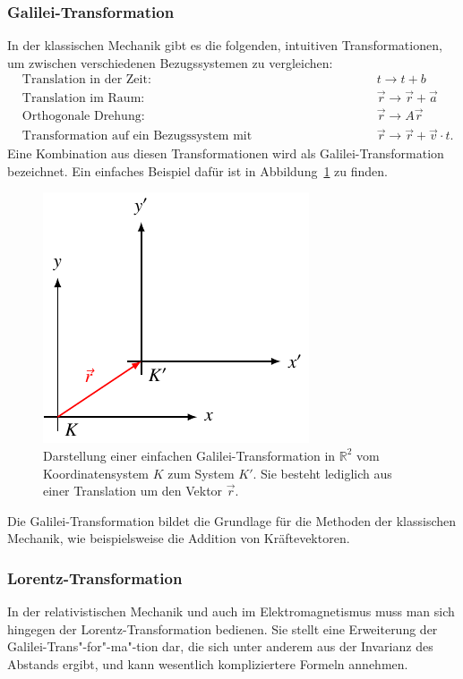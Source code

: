 \subsubsection{Galilei-Transformation 
\label{relativ:section:galilei-trafo}}
%
In der klassischen Mechanik gibt es die folgenden,
intuitiven Transformationen, um zwischen verschiedenen Bezugssystemen
zu vergleichen:
\[
\begin{aligned}
    &\text{Translation in der Zeit: } && t \rightarrow t + b \\
    &\text{Translation im Raum: } && \vec{r} \rightarrow \vec{r} + \vec{a} \\
    &\text{Orthogonale Drehung: } && \vec{r} \rightarrow A \vec{r} \\
    &\text{Transformation auf ein Bezugssystem mit Relativgeschwindigkeit: } && \vec{r} \rightarrow \vec{r} + \vec{v} \cdot t .
\end{aligned}
\]
Eine Kombination aus diesen Transformationen wird als Galilei-Transformation bezeichnet.
Ein einfaches Beispiel dafür ist in Abbildung~\ref{relativ:fig:galilei-trafo} zu finden.
\begin{figure}
    \centering
    \includegraphics{papers/relativ/tikz/galilei_trafo.pdf}
    \caption{Darstellung einer einfachen Galilei-Transformation in \(\mathbb{R}^2\)
    vom Koordinatensystem \(K\) zum System \(K'\).
    Sie besteht lediglich aus einer Translation um den Vektor \(\vec{r}\).
    \label{relativ:fig:galilei-trafo}}
\end{figure}
Die Galilei-Transformation bildet die Grundlage für die Methoden der klassischen Mechanik,
wie beispielsweise die Addition von Kräftevektoren.

\subsubsection{Lorentz-Transformation 
\label{relativ:section:lorentz-trafo}}
In der relativistischen Mechanik und auch im Elektromagnetismus
muss man sich hingegen der Lorentz-Transformation bedienen.
%
Sie stellt eine Erweiterung der Galilei-Trans"-for"-ma"-tion dar,
die sich unter anderem aus der Invarianz des Abstands ergibt,
und kann wesentlich kompliziertere Formeln annehmen.

